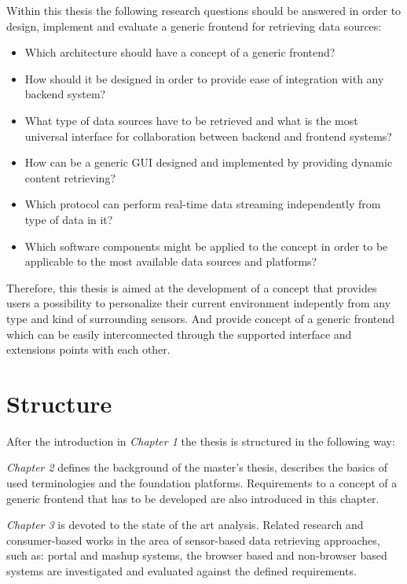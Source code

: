        Within this thesis the following research questions should be answered in order to design, implement and evaluate a generic frontend for retrieving data sources: 
       \begin{itemize}
       \item Which architecture should have a concept of a generic frontend?
       \item How should it be designed in order to provide ease of integration with any backend system?
       \item What type of data sources have to be retrieved and what is the most universal interface for collaboration between backend and frontend systems?
       \item How can be a generic GUI designed and implemented by providing dynamic content retrieving?
       \item Which protocol can perform real-time data streaming independently from type of data in it?
       \item Which software components might be applied to the concept in order to be applicable to the most available data sources and platforms?
       \end{itemize}

     Therefore, this thesis is aimed at the development of a concept that provides users a possibility to personalize their current environment indepently from any type and kind of surrounding sensors. And provide concept of a generic frontend which can be easily interconnected through the supported interface and extensions points with each other.

\section{Structure}

After the introduction in \emph{Chapter 1} the thesis is structured in the following way:

\emph{Chapter 2} defines the background of the master's thesis, describes the basics of used terminologies and the foundation platforms. Requirements to a concept of a generic frontend that has to be developed are also introduced in this chapter.

\emph{Chapter 3} is devoted to the state of the art analysis. Related research and consumer-based works in the area of sensor-based data retrieving approaches, such as: portal and mashup systems, the browser based and non-browser based systems are investigated and evaluated against the defined requirements.

